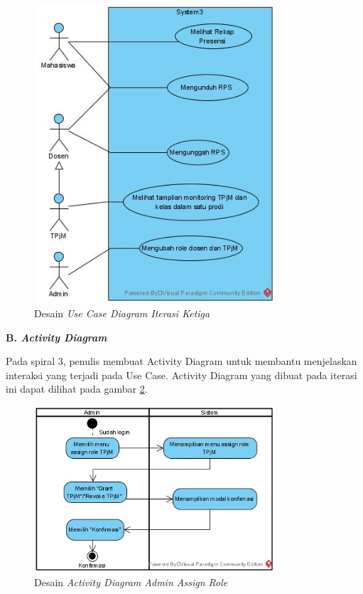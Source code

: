 \begin{figure}[h!]
	\centering
	\includegraphics[width=0.8\textwidth]{gambar/diagram/Use Case Iteration 3}
	\caption{Desain \textit{Use Case Diagram Iterasi Ketiga}}
	\label{fig:usecase3rd}
\end{figure}

\textbf{B. \textit{Activity Diagram}}

	Pada spiral 3, penulis membuat Activity Diagram untuk membantu menjelaskan interaksi yang terjadi pada Use Case. Activity Diagram yang dibuat pada iterasi ini dapat dilihat pada gambar \ref{fig:actadmin}.

\begin{figure}[h!]
	\centering
	\includegraphics[width=0.8\textwidth]{gambar/diagram/Admin Assign Role}
	\caption{Desain \textit{Activity Diagram Admin Assign Role}}
	\label{fig:actadmin}
\end{figure}

